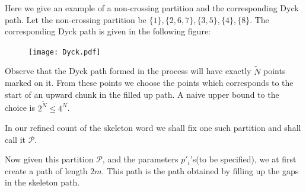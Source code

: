 \documentclass[12pt]{article}
\numberwithin{equation}{section}
\numberwithin{equation}{section}
\theoremstyle{definition}
\renewcommand{\1}{\bf 1}
\begin{document}
\noindent
Here we give an example of a non-crossing partition and the corresponding Dyck path. Let the non-crossing partition be $\{ 1 \}, \{ 2,6,7 \}, \{ 3,5 \}, \{ 4 \},\{ 8 \}$. The corresponding Dyck path is given in the following figure:
\begin{figure}[H]
        \begin{center}
                \texttt{[image: Dyck.pdf]}
        ~ %
      \end{center}   
 \end{figure}  
 




\noindent
Observe that the Dyck path formed in the process will have exactly $\tilde{N}$ points marked on it. From these points we choose the points which corresponds to the start of an upward chunk in the filled up path. A naive upper bound to the choice is $2^{\tilde{N}}\le 4^{N}$.

\noindent 
In our refined count of the skeleton word we shall fix one such partition and shall call it $\mathcal{P}$. 

\noindent
Now given this partition $\mathcal{P}$, and the parameters $p'_{i}$'s(to be specified), we at first create a path of length $2m$. This path is the path obtained by filling up the gaps in the skeleton path.
\end{document}
